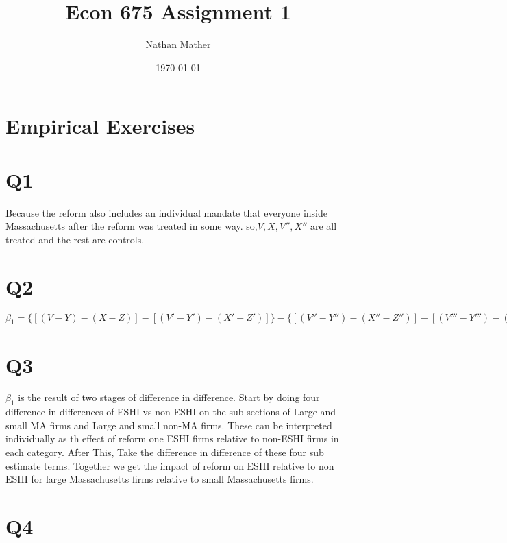 \documentclass[11pt]{article}
\title{Econ 675 Assignment 1} %
\author{Nathan Mather} %
\date{\today} %
\begin{document}
	
\maketitle %

\setcounter{tocdepth}{2} %



\section{Empirical Exercises}


 


\section{Q1}

Because the reform also includes an individual mandate that everyone inside Massachusetts after the reform was treated in some way. so,$ V, X, V'',X''$ are all treated and the rest are controls. 


\section{Q2}

$\beta_1 = \{[(V-Y) - (X-Z)] - [(V'-Y') - (X'-Z')]\} - \{[(V'' - Y'') - (X''-Z'')] - [(V'''-Y''')-(X'''-Z''')]\}$

\section{Q3}

$\beta_1$ is the result of two stages of difference in difference. Start by doing four difference in differences of ESHI vs non-ESHI on the sub sections of Large and small MA firms and Large and small non-MA firms. These can be interpreted individually as th effect of reform one ESHI firms relative to non-ESHI firms in each category. After This, Take the difference in difference of these four sub estimate terms. Together we get the impact of reform on ESHI relative to non ESHI for large Massachusetts firms relative to small Massachusetts firms. 

\section{Q4}
\end{document}
